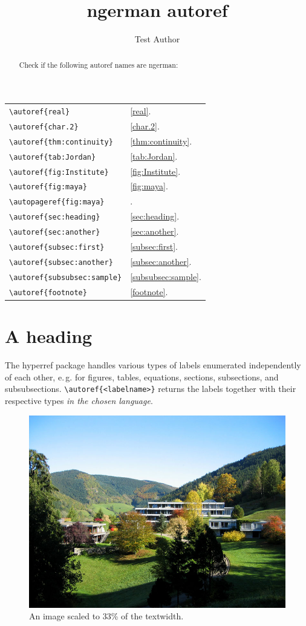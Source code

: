 \documentclass{snapshotmfo}
\author{Test Author}
\title{ngerman autoref}
\begin{document}

\begin{abstract}
Check if the following autoref names are ngerman:
\end{abstract}

\noindent\begin{tabular}{@{}l@{\quad yields\quad}l@{}}
	\verb+\autoref{real}+             &\autoref{real}.\\
	\verb+\autoref{char.2}+           &\autoref{char.2}.\\
	\verb+\autoref{thm:continuity}+   &\autoref{thm:continuity}.\\
	\verb+\autoref{tab:Jordan}+       &\autoref{tab:Jordan}.\\
	\verb+\autoref{fig:Institute}+    &\autoref{fig:Institute}.\\
	\verb+\autoref{fig:maya}+         &\autoref{fig:maya}.\\
	\verb+\autopageref{fig:maya}+     &\autopageref{fig:maya}.\\
	\verb+\autoref{sec:heading}+      &\autoref{sec:heading}.\\
	\verb+\autoref{sec:another}+      &\autoref{sec:another}.\\
	\verb+\autoref{subsec:first}+     &\autoref{subsec:first}.\\
	\verb+\autoref{subsec:another}+   &\autoref{subsec:another}.\\
	\verb+\autoref{subsubsec:sample}+ &\autoref{subsubsec:sample}.\\
	\verb+\autoref{footnote}+         &\autoref{footnote}.\\
\end{tabular}


\section{A heading}
\label{sec:heading}
The hyperref package handles various types of labels enumerated independently of each other, e.\,g.
for figures, tables, equations, sections, subsections, and subsubsections.
\verb+\autoref{<labelname>}+ returns the labels together with their respective types {\em in the chosen language}.

\begin{figure}[ht]
	\centering
	\includegraphics[width= 0.33 \textwidth]{mfo.jpg}
	\caption{An image scaled to 33\% of the textwidth.}
	\label{fig:Institute}
\end{figure}
\end{document}
